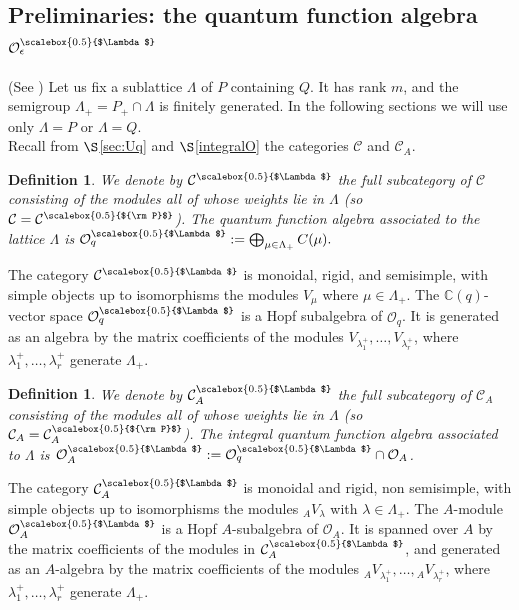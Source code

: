 \documentclass[11pt]{amsart}
\newtheorem{defi}[teo]{Definition}
\newcommand{\e}{\epsilon}
\newcommand{\mc}{\mathbb{C}}
\newcommand{\Oo}{\mathcal{O}}
\newcommand{\Pup}{{\scalebox{0.5}{${\rm P}$}}}
\newcommand{\Lam}{{\scalebox{0.5}{$\Lambda$}}}
\begin{document}
\subsection{Preliminaries: the quantum function algebra \texorpdfstring{$\Oo_\e^\Lam$}{for a sublattice}}  (See \cite{BG}) Let us fix a sublattice $\Lambda$ of $P$ containing $Q$. It has rank $m$, and the semigroup $\Lambda_+ = P_+\cap \Lambda$ is finitely generated. In the following sections we will use only $\Lambda=P$ or $\Lambda=Q$. \\
\indent Recall from $\S$\ref{sec:Uq} and $\S$\ref{integralO} the categories $\mathcal{C}$ and $\mathcal{C}_A$.

\begin{defi}{\rm We denote by ${\mathcal C}^\Lam$ the full subcategory of ${\mathcal C}$ consisting of the modules all of whose weights lie in $\Lambda$ (so ${\mathcal C} = {\mathcal C}^\Pup$). The quantum function algebra associated to the lattice $\Lambda$ is $\textstyle {\mathcal O}_q^\Lam:= \bigoplus_{\mu\in \Lambda_+}C(\mu).$}
\end{defi}
The category ${\mathcal C}^\Lam$ is monoidal, rigid, and semisimple, with simple objects up to isomorphisms the modules $V_\mu$ where $\mu\in\Lambda_+$. The $\mc(q)$-vector space ${\mathcal O}_q^\Lam$ is a Hopf subalgebra of $\Oo_q$. It is generated as an algebra by the matrix coefficients of the modules $V_{\lambda_1^+},\ldots , V_{\lambda_r^+}$, where $\lambda_1^+,\ldots, \lambda_r^+$ generate $\Lambda_+$.
\begin{defi}{\rm We denote by ${\mathcal C}^\Lam_A$ the full subcategory of ${\mathcal C}_A$ consisting of the modules all of whose weights lie in $\Lambda$ (so ${\mathcal C}_A = {\mathcal C}^\Pup_A$). The integral quantum function algebra associated to $\Lambda$ is $\Oo_A^\Lam := \Oo_q^\Lam \cap \Oo_A$.}
\end{defi}
The category ${\mathcal C}^\Lam_A$ is monoidal and rigid, non semisimple, with simple objects up to isomorphisms the modules ${}_AV_\lambda$ with $\lambda\in \Lambda_+$. The $A$-module $\Oo_A^\Lam$ is a Hopf $A$-subalgebra of $\Oo_A$. It is spanned over $A$ by the matrix coefficients of the modules in $\mathcal{C}_A^\Lam$, and generated as an $A$-algebra by the matrix coefficients of the modules ${}_AV_{\lambda_1^+},\ldots , {}_AV_{\lambda_r^+}$, where $\lambda_1^+,\ldots, \lambda_r^+$ generate $\Lambda_+$.
\smallskip
\end{document}
